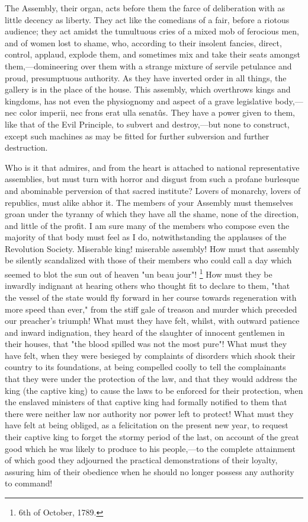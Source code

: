 The Assembly, their organ, acts before them the farce of deliberation with as little decency as liberty. They act like the comedians of a fair, before a riotous audience; they act amidst the tumultuous cries of a mixed mob of ferocious men, and of women lost to shame, who, according to their insolent fancies, direct, control, applaud, explode them, and sometimes mix and take their seats amongst them,—domineering over them with a strange mixture of servile petulance and proud, presumptuous authority. As they have inverted order in all things, the gallery is in the place of the house. This assembly, which overthrows kings and kingdoms, has not even the physiognomy and aspect of a grave legislative body,—nec color imperii, nec frons erat ulla senatûs. They have a power given to them, like that of the Evil Principle, to subvert and destroy,—but none to construct, except such machines as may be fitted for further subversion and further destruction.

Who is it that admires, and from the heart is attached to national representative assemblies, but must turn with horror and disgust from such a profane burlesque and abominable perversion of that sacred institute? Lovers of monarchy, lovers of republics, must alike abhor it. The members of your Assembly must themselves groan under the tyranny of which they have all the shame, none of the direction, and little of the profit. I am sure many of the members who compose even the majority of that body must feel as I do, notwithstanding the applauses of the Revolution Society. Miserable king! miserable assembly! How must that assembly be silently scandalized with those of their members who could call a day which seemed to blot the sun out of heaven "un beau jour"!
\footnote{ 6th of October, 1789.}
 How must they be inwardly indignant at hearing others who thought fit to declare to them, "that the vessel of the state would fly forward in her course towards regeneration with more speed than ever," from the stiff gale of treason and murder which preceded our preacher's triumph! What must they have felt, whilst, with outward patience and inward indignation, they heard of the slaughter of innocent gentlemen in their houses, that "the blood spilled was not the most pure"! What must they have felt, when they were besieged by complaints of disorders which shook their country to its foundations, at being compelled coolly to tell the complainants that they were under the protection of the law, and that they would address the king (the captive king) to cause the laws to be enforced for their protection, when the enslaved ministers of that captive king had formally notified to them that there were neither law nor authority nor power left to protect! What must they have felt at being obliged, as a felicitation on the present new year, to request their captive king to forget the stormy period of the last, on account of the great good which he was likely to produce to his people,—to the complete attainment of which good they adjourned the practical demonstrations of their loyalty, assuring him of their obedience when he should no longer possess any authority to command!

